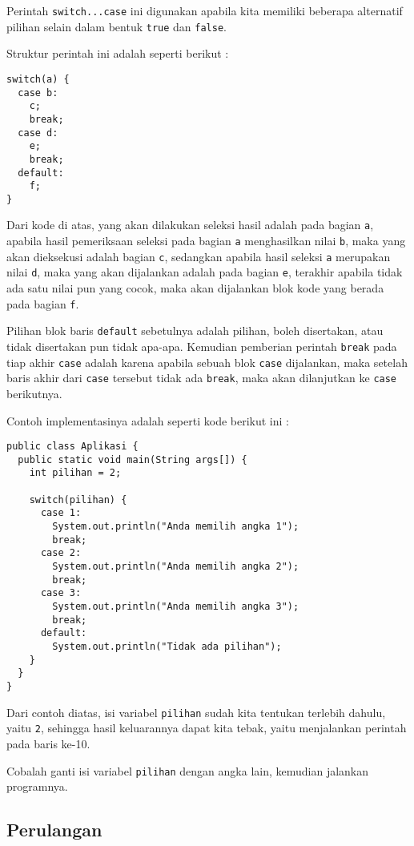 Perintah \texttt{switch...case} ini digunakan apabila kita memiliki beberapa alternatif pilihan selain dalam bentuk \texttt{true} dan \texttt{false}. 

Struktur perintah ini adalah seperti berikut :

\begin{lstlisting}
switch(a) {
  case b:
    c;
    break;
  case d:
    e;
    break;
  default:
    f;
}
\end{lstlisting}

Dari kode di atas, yang akan dilakukan seleksi hasil adalah pada bagian \texttt{a}, apabila hasil pemeriksaan seleksi pada bagian \texttt{a} menghasilkan nilai \texttt{b}, maka yang akan dieksekusi adalah bagian \texttt{c}, sedangkan apabila hasil seleksi \texttt{a} merupakan nilai \texttt{d}, maka yang akan dijalankan adalah pada bagian \texttt{e}, terakhir apabila tidak ada satu nilai pun yang cocok, maka akan dijalankan blok kode yang berada pada bagian \texttt{f}.

Pilihan blok baris \texttt{default} sebetulnya adalah pilihan, boleh disertakan, atau tidak disertakan pun tidak apa-apa. Kemudian pemberian perintah \texttt{break} pada tiap akhir \texttt{case} adalah karena apabila sebuah blok \texttt{case} dijalankan, maka setelah baris akhir dari \texttt{case} tersebut tidak ada \texttt{break}, maka akan dilanjutkan ke \texttt{case} berikutnya.

Contoh implementasinya adalah seperti kode berikut ini :

\begin{lstlisting}
public class Aplikasi {
  public static void main(String args[]) {
    int pilihan = 2;
    
    switch(pilihan) {
      case 1:
        System.out.println("Anda memilih angka 1");
        break;
      case 2:
        System.out.println("Anda memilih angka 2");
        break;
      case 3:
        System.out.println("Anda memilih angka 3");
        break;
      default:
        System.out.println("Tidak ada pilihan");
    }
  }
}
\end{lstlisting}

Dari contoh diatas, isi variabel \texttt{pilihan} sudah kita tentukan terlebih dahulu, yaitu \texttt{2}, sehingga hasil keluarannya dapat kita tebak, yaitu menjalankan perintah pada baris ke-10.

Cobalah ganti isi variabel \texttt{pilihan} dengan angka lain, kemudian jalankan programnya.

\subsection{Perulangan}

